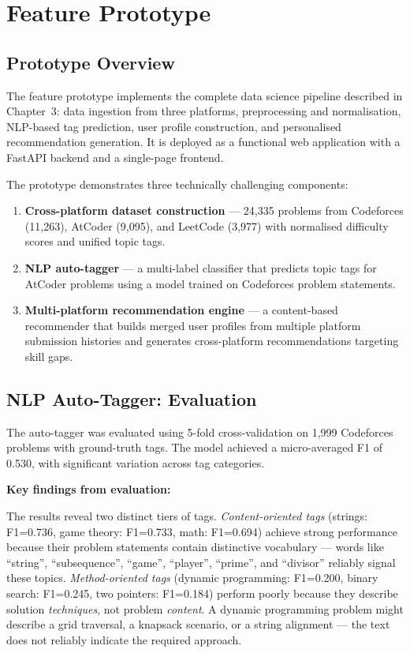 \documentclass[12pt,a4paper]{article}
\begin{document}
\section{Feature Prototype}

\subsection{Prototype Overview}

The feature prototype implements the complete data science pipeline described in Chapter~3: data ingestion from three platforms, preprocessing and normalisation, NLP-based tag prediction, user profile construction, and personalised recommendation generation. It is deployed as a functional web application with a FastAPI backend and a single-page frontend.

The prototype demonstrates three technically challenging components:

\begin{enumerate}
    \item \textbf{Cross-platform dataset construction} --- 24,335 problems from Codeforces (11,263), AtCoder (9,095), and LeetCode (3,977) with normalised difficulty scores and unified topic tags.
    \item \textbf{NLP auto-tagger} --- a multi-label classifier that predicts topic tags for AtCoder problems using a model trained on Codeforces problem statements.
    \item \textbf{Multi-platform recommendation engine} --- a content-based recommender that builds merged user profiles from multiple platform submission histories and generates cross-platform recommendations targeting skill gaps.
\end{enumerate}

\subsection{NLP Auto-Tagger: Evaluation}

The auto-tagger was evaluated using 5-fold cross-validation on 1,999 Codeforces problems with ground-truth tags. The model achieved a micro-averaged F1 of 0.530, with significant variation across tag categories.

\textbf{Key findings from evaluation:}

The results reveal two distinct tiers of tags. \emph{Content-oriented tags} (strings: F1=0.736, game theory: F1=0.733, math: F1=0.694) achieve strong performance because their problem statements contain distinctive vocabulary --- words like ``string'', ``subsequence'', ``game'', ``player'', ``prime'', and ``divisor'' reliably signal these topics. \emph{Method-oriented tags} (dynamic programming: F1=0.200, binary search: F1=0.245, two pointers: F1=0.184) perform poorly because they describe solution \emph{techniques}, not problem \emph{content}. A dynamic programming problem might describe a grid traversal, a knapsack scenario, or a string alignment --- the text does not reliably indicate the required approach.
\end{document}
